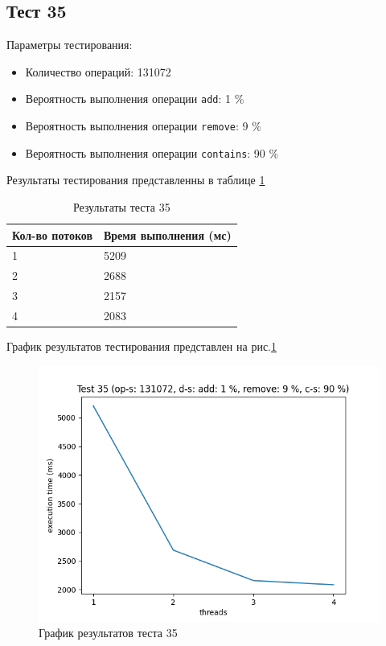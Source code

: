 \subsection*{Тест 35}

Параметры тестирования:

\begin{itemize}
    \item Количество операций: 131072
    \item Вероятность выполнения операции \verb|add|: 1 \%
    \item Вероятность выполнения операции \verb|remove|: 9 \%
    \item Вероятность выполнения операции \verb|contains|: 90 \%
\end{itemize}

Результаты тестирования представленны в таблице \ref{tab:results35}


\begin{table}[H]
    \centering
    \begin{tabular}{|l|l|}
        \hline
        Кол-во потоков & Время выполнения (мс) \\
        \hline
        1 & 5209 \\
        \hline
        2 & 2688 \\
        \hline
        3 & 2157 \\
        \hline
        4 & 2083 \\
        \hline
    \end{tabular}
    \caption{Результаты теста 35}
    \label{tab:results35}
\end{table}
        

График результатов тестирования представлен на рис.\ref{fig:plot35}

\begin{figure}[H]
    \centering
    \includegraphics[width=0.7\linewidth]{photo/plot35}
    \caption{График результатов теста 35}
    \label{fig:plot35}
\end{figure}